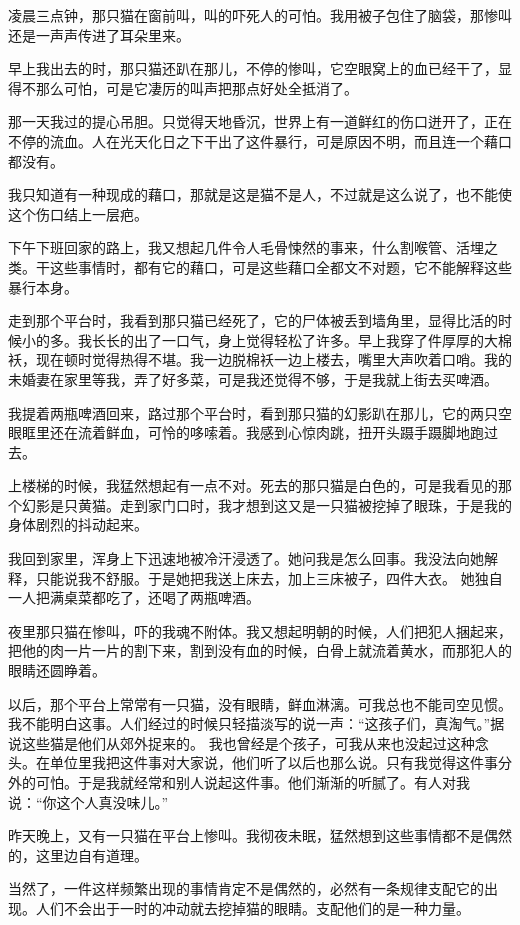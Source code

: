 凌晨三点钟，那只猫在窗前叫，叫的吓死人的可怕。我用被子包住了脑袋，那惨叫还是一声声传进了耳朵里来。 

早上我出去的时，那只猫还趴在那儿，不停的惨叫，它空眼窝上的血已经干了，显得不那么可怕，可是它凄厉的叫声把那点好处全抵消了。 

那一天我过的提心吊胆。只觉得天地昏沉，世界上有一道鲜红的伤口迸开了，正在不停的流血。人在光天化日之下干出了这件暴行，可是原因不明，而且连一个藉口都没有。 

我只知道有一种现成的藉口，那就是这是猫不是人，不过就是这么说了，也不能使这个伤口结上一层疤。 

下午下班回家的路上，我又想起几件令人毛骨悚然的事来，什么割喉管、活埋之类。干这些事情时，都有它的藉口，可是这些藉口全都文不对题，它不能解释这些暴行本身。 

走到那个平台时，我看到那只猫已经死了，它的尸体被丢到墙角里，显得比活的时候小的多。我长长的出了一口气，身上觉得轻松了许多。早上我穿了件厚厚的大棉袄，现在顿时觉得热得不堪。我一边脱棉袄一边上楼去，嘴里大声吹着口哨。我的未婚妻在家里等我，弄了好多菜，可是我还觉得不够，于是我就上街去买啤酒。 

我提着两瓶啤酒回来，路过那个平台时，看到那只猫的幻影趴在那儿，它的两只空眼眶里还在流着鲜血，可怜的哆嗦着。我感到心惊肉跳，扭开头蹑手蹑脚地跑过去。 

上楼梯的时候，我猛然想起有一点不对。死去的那只猫是白色的，可是我看见的那个幻影是只黄猫。走到家门口时，我才想到这又是一只猫被挖掉了眼珠，于是我的身体剧烈的抖动起来。 

我回到家里，浑身上下迅速地被冷汗浸透了。她问我是怎么回事。我没法向她解释，只能说我不舒服。于是她把我送上床去，加上三床被子，四件大衣。 她独自一人把满桌菜都吃了，还喝了两瓶啤酒。 

夜里那只猫在惨叫，吓的我魂不附体。我又想起明朝的时候，人们把犯人捆起来，把他的肉一片一片的割下来，割到没有血的时候，白骨上就流着黄水，而那犯人的眼睛还圆睁着。 

以后，那个平台上常常有一只猫，没有眼睛，鲜血淋漓。可我总也不能司空见惯。我不能明白这事。人们经过的时候只轻描淡写的说一声：“这孩子们，真淘气。”据说这些猫是他们从郊外捉来的。 我也曾经是个孩子，可我从来也没起过这种念头。在单位里我把这件事对大家说，他们听了以后也那么说。只有我觉得这件事分外的可怕。于是我就经常和别人说起这件事。他们渐渐的听腻了。有人对我说：“你这个人真没味儿。” 

昨天晚上，又有一只猫在平台上惨叫。我彻夜未眠，猛然想到这些事情都不是偶然的，这里边自有道理。 

当然了，一件这样频繁出现的事情肯定不是偶然的，必然有一条规律支配它的出现。人们不会出于一时的冲动就去挖掉猫的眼睛。支配他们的是一种力量。 

